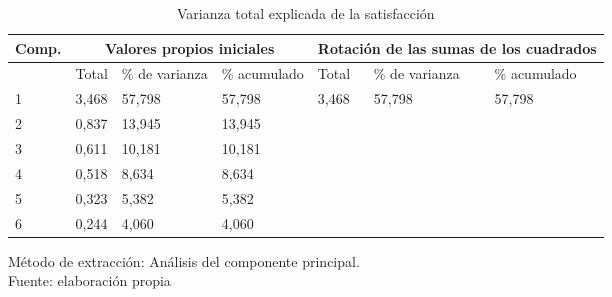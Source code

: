 \begin{table}[h]
    \caption {Varianza total explicada de la satisfacción}
	\label{tab:varianzaExplicadaS}
	\setlength\extrarowheight{5pt}
	
	\begin{tabular}{p{1.5cm} p{1.9cm} p{1.7cm} p{1.7cm} p{1.9cm} p{1.9cm} p{1.7cm}}
	\toprule
	Comp.	& \multicolumn{3}{c}{Valores propios iniciales} & \multicolumn{3}{c}{Rotación de las sumas de los cuadrados} \\
	\midrule
		& Total	& \% de varianza	& \% acumulado	& Total	& \% de varianza 	& \% acumulado \\
	\midrule
	1  & 3,468 & 57,798 & 	57,798 & 3,468 & 57,798 & 57,798 \\
	2  & 0,837 & 13,945 & 	13,945 & &  &  \\
	3  & 0,611 & 10,181 &	10,181 & &  &  \\
	4  & 0,518 & 8,634 &	8,634 &  &  &  \\
	5  & 0,323 & 5,382 &	5,382 &  &  &  \\
	6  & 0,244 & 4,060 &	4,060 &  &  &  \\
	\bottomrule
	\end{tabular}
	
	\center
	\footnotesize
	Método de extracción: Análisis del componente principal.\\
	Fuente: elaboración propia
\end{table}
